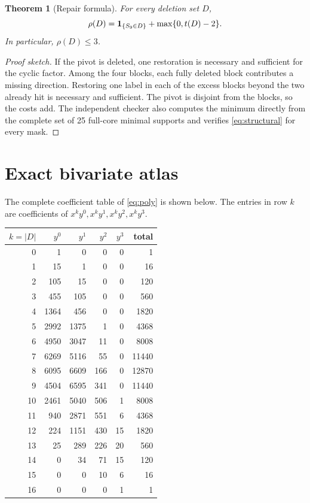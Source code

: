 \documentclass[10pt]{article}
\newtheorem{theorem}{Theorem}
\begin{document}
\begin{theorem}[Repair formula]
For every deletion set $D$,
\begin{equation}
 \rho(D)={\bf 1}_{\{S_9\in D\}}+\max\{0,t(D)-2\}.
 \label{eq:structural}
\end{equation}
In particular, $\rho(D)\leq3$.
\end{theorem}

\begin{proof}[Proof sketch]
If the pivot is deleted, one restoration is necessary and sufficient for the
cyclic factor.  Among the four blocks, each fully deleted block contributes a
missing direction.  Restoring one label in each of the excess blocks beyond
the two already hit is necessary and sufficient.  The pivot is disjoint from
the blocks, so the costs add.  The independent checker also computes the
minimum directly from the complete set of 25 full-core minimal supports and verifies
\eqref{eq:structural} for every mask.
\end{proof}

\section{Exact bivariate atlas}
The complete coefficient table of \eqref{eq:poly} is shown below.  The entries
in row $k$ are coefficients of $x^ky^0,x^ky^1,x^ky^2,x^ky^3$.

\begin{center}
\small
\begin{tabular}{r|rrrr|r}
\toprule
$k=|D|$ & $y^0$ & $y^1$ & $y^2$ & $y^3$ & total\\
\midrule
0&1&0&0&0&1\\
1&15&1&0&0&16\\
2&105&15&0&0&120\\
3&455&105&0&0&560\\
4&1364&456&0&0&1820\\
5&2992&1375&1&0&4368\\
6&4950&3047&11&0&8008\\
7&6269&5116&55&0&11440\\
8&6095&6609&166&0&12870\\
9&4504&6595&341&0&11440\\
10&2461&5040&506&1&8008\\
11&940&2871&551&6&4368\\
12&224&1151&430&15&1820\\
13&25&289&226&20&560\\
14&0&34&71&15&120\\
15&0&0&10&6&16\\
16&0&0&0&1&1\\
\bottomrule
\end{tabular}
\end{center}
\end{document}
